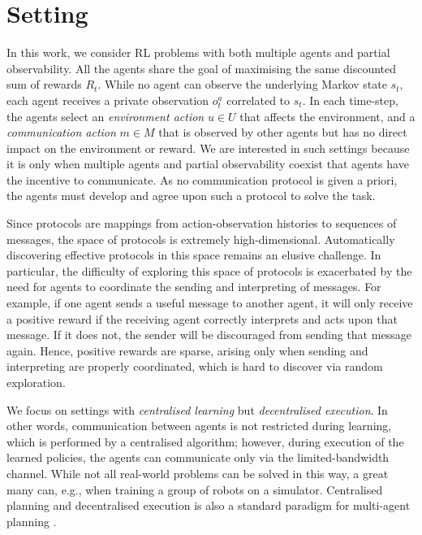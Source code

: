 \section{Setting}
\label{sec:problem_setting}

In this work, we consider RL problems with both multiple agents and partial observability. All the agents share the goal of maximising the same discounted sum of rewards $R_t$.  While no agent can observe the underlying Markov state $s_t$, each agent receives a private observation $o^a_t$ correlated to $s_t$.  In each time-step, the agents select an \emph{environment action} $u \in U$ that affects the environment, and a \emph{communication action} $m \in M$ that is observed by other agents but has no direct impact on the environment or reward.
We are interested in such settings because it is only when multiple agents and partial observability coexist that agents have the incentive to communicate. As no communication protocol is given a priori, the agents must develop and agree upon such a protocol to solve the task.

Since protocols are mappings from action-observation histories to sequences of messages, the space of protocols is extremely high-dimensional. Automatically discovering effective protocols in this space remains an elusive challenge.  In particular, the difficulty of exploring this space of protocols is exacerbated by the need for agents to coordinate the sending and interpreting of messages.  For example, if one agent sends a useful message to another agent, it will only receive a positive reward if the receiving agent correctly interprets and acts upon that message.  If it does not, the sender will be discouraged from sending that message again.  Hence,  positive rewards are sparse, arising only when sending and interpreting are properly coordinated, which is hard to discover via random exploration.

We focus on settings with \emph{centralised learning} but \emph{decentralised execution}.  In other words, communication between agents is not restricted during learning, which is performed by a centralised algorithm; however, during execution of the learned policies, the agents can communicate only via the limited-bandwidth channel.  While not all real-world problems can be solved in this way, a great many can, e.g., when training a group of robots on a simulator.  Centralised planning and decentralised execution is also a standard paradigm for multi-agent planning \cite{Oliehoek08JAIR,kraemer2016multi}. 



